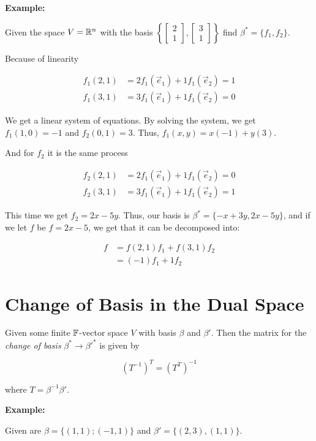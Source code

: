 \textbf{Example:}

Given the space \(V = \mathbb{R}^n\) with the basis \(\left\{\begin{bmatrix}
    2 \\ 1 \end{bmatrix}, \begin{bmatrix} 3 \\ 1\end{bmatrix}\right\}\) find \(\beta^* = \{f_1, f_2\}\).

Because of linearity

\begin{align*}
    f_1(2,1) & = 2f_1(\vec{e}_1) + 1 f_1(\vec{e}_2) = 1 \\
    f_1(3,1) & = 3f_1(\vec{e}_1) + 1 f_1(\vec{e}_2) = 0
\end{align*}

We get a linear system of equations. By solving the system, we get \(f_1(1, 0) = -1\) and
\(f_2(0, 1) = 3\). Thus, \(f_1(x,y) = x(-1) + y(3)\).

And for \(f_2\) it is the same process

\begin{align*}
    f_2(2,1) & = 2f_1(\vec{e}_1) + 1 f_1(\vec{e}_2) = 0 \\
    f_2(3,1) & = 3f_1(\vec{e}_1) + 1 f_1(\vec{e}_2) = 1
\end{align*}

This time we get \(f_2 = 2x - 5y\). Thus, our basis is \(\beta^* = \{-x + 3y, 2x - 5y\}\), and
if we let \(f\) be \(f = 2x -5\), we get that it can be decomposed into:

\begin{align*}
    f & = f(2,1) f_1 + f(3,1) f_2 \\
      & = (-1) f_1 + 1 f_2
\end{align*}


\section{Change of Basis in the Dual Space}

Given some finite \(\mathbb{F}\)-vector space \(V\) with basis \(\beta\) and \(\beta'\). Then the matrix for
the \emph{change of basis} \(\beta^* \to \beta'^*\) is given by

\[
    (T^{-1})^T = (T^T)^{-1}
\]

where \(T = \beta^{-1}\beta'\).

\textbf{Example: }

Given are \(\beta = \{(1, 1); (-1, 1)\}\) and \(\beta' = \{(2,3), (1,1)\}\).

